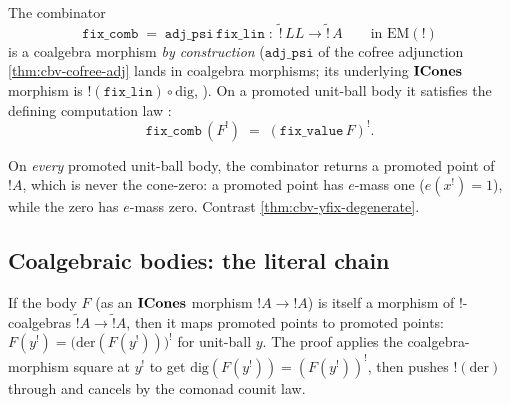 \begin{theorem}\label{thm:cbv-fix-comb}
\rocqok
{}\rocqok
{}\rocqok
{}
The combinator
\[
  \mathtt{fix\_comb}
  \;=\;
  \mathtt{adj\_psi}\,\mathtt{fix\_lin}
  \;:\;
  \widetilde{\mathord{!}}\,LL
  \longrightarrow
  \widetilde{\mathord{!}}\,A
  \qquad\text{in } \mathrm{EM}(\mathord{!})
\]
is a coalgebra morphism \emph{by construction} ($\mathtt{adj\_psi}$ of
the cofree adjunction \autoref{thm:cbv-cofree-adj} lands in coalgebra
morphisms; its underlying $\mathbf{ICones}$ morphism is
$\mathord{!}(\mathtt{fix\_lin}) \circ \mathrm{dig}$,
). On a promoted
unit-ball body it satisfies the defining computation law
:
\[
  \mathtt{fix\_comb}\,(F^!)
  \;=\;
  (\mathtt{fix\_value}\,F)^!.
\]
\end{theorem}

\begin{lemma}\label{lem:cbv-fix-nondegen}
\rocqok
{}\rocqok
{}
On \emph{every} promoted unit-ball body, the combinator returns a
promoted point of $\mathord{!}A$, which is never the cone-zero: a
promoted point has $e$-mass one ($e(x^!) = 1$), while the zero has
$e$-mass zero. Contrast \autoref{thm:cbv-yfix-degenerate}.
\end{lemma}

\subsection{Coalgebraic bodies: the literal chain}%
\label{ssec:cbv-fix-coalg}

\begin{lemma}%
\label{lem:cbv-fix-setlike}
\rocqok
{}
If the body $F$ (as an $\mathbf{ICones}$ morphism
$\mathord{!}A \to \mathord{!}A$) is itself a morphism of
$\mathord{!}$-coalgebras
$\widetilde{\mathord{!}}A \to \widetilde{\mathord{!}}A$, then it maps
promoted points to promoted points:
$F(y^!) = \bigl(\mathrm{der}(F(y^!))\bigr)^!$ for unit-ball $y$. The
proof applies the coalgebra-morphism square at $y^!$ to get
$\mathrm{dig}(F(y^!)) = (F(y^!))^!$, then pushes
$\mathord{!}(\mathrm{der})$ through and cancels by the comonad counit
law.
\end{lemma}

